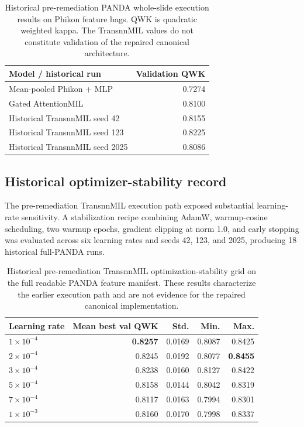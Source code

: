 \documentclass[10pt]{article}
\begin{document}
\begin{table}[t]
\centering
\caption{Historical pre-remediation PANDA whole-slide execution results on Phikon feature bags. QWK is quadratic weighted kappa. The TransnnMIL values do not constitute validation of the repaired canonical architecture.}
\label{tab:panda_mil}
\small
\begin{tabular}{lr}
\toprule
Model / historical run & Validation QWK \\
\midrule
Mean-pooled Phikon + MLP & 0.7274 \\
Gated AttentionMIL & 0.8100 \\
Historical TransnnMIL seed 42 & 0.8155 \\
Historical TransnnMIL seed 123 & 0.8225 \\
Historical TransnnMIL seed 2025 & 0.8086 \\
\bottomrule
\end{tabular}
\end{table}

\subsection{Historical optimizer-stability record}
The pre-remediation TransnnMIL execution path exposed substantial learning-rate sensitivity. A stabilization recipe combining AdamW, warmup-cosine scheduling, two warmup epochs, gradient clipping at norm 1.0, and early stopping was evaluated across six learning rates and seeds 42, 123, and 2025, producing 18 historical full-PANDA runs.

\begin{table}[t]
\centering
\caption{Historical pre-remediation TransnnMIL optimization-stability grid on the full readable PANDA feature manifest. These results characterize the earlier execution path and are not evidence for the repaired canonical implementation.}
\label{tab:transnnmil_stability}
\small
\begin{tabular}{lrrrr}
\toprule
Learning rate & Mean best val QWK & Std. & Min. & Max. \\
\midrule
$1\times10^{-4}$ & \textbf{0.8257} & 0.0169 & 0.8087 & 0.8425 \\
$2\times10^{-4}$ & 0.8245 & 0.0192 & 0.8077 & \textbf{0.8455} \\
$3\times10^{-4}$ & 0.8238 & 0.0160 & 0.8127 & 0.8422 \\
$5\times10^{-4}$ & 0.8158 & 0.0144 & 0.8042 & 0.8319 \\
$7\times10^{-4}$ & 0.8117 & 0.0163 & 0.7994 & 0.8301 \\
$1\times10^{-3}$ & 0.8160 & 0.0170 & 0.7998 & 0.8337 \\
\bottomrule
\end{tabular}
\end{table}
\end{document}
